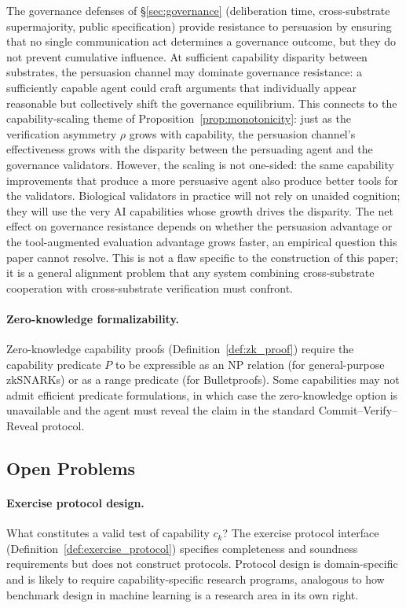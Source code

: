 The governance defenses of \S\ref{sec:governance} (deliberation
time, cross-substrate supermajority, public specification) provide
resistance to persuasion by ensuring that no single communication
act determines a governance outcome, but they do not prevent
cumulative influence.  At sufficient capability disparity between
substrates, the persuasion channel may dominate governance
resistance: a sufficiently capable agent could craft arguments that
individually appear reasonable but collectively shift the
governance equilibrium.  This connects to the capability-scaling
theme of Proposition~\ref{prop:monotonicity}: just as the
verification asymmetry $\rho$ grows with capability, the persuasion
channel's effectiveness grows with the disparity between the
persuading agent and the governance validators.  However, the
scaling is not one-sided: the same capability improvements that
produce a more persuasive agent also produce better tools for the
validators.  Biological validators in practice will not rely on
unaided cognition; they will use the very AI capabilities whose
growth drives the disparity.  The net effect on governance
resistance depends on whether the persuasion advantage or the
tool-augmented evaluation advantage grows faster, an empirical
question this paper cannot resolve.  This is not a flaw specific to
the construction of this paper; it is a general alignment problem
that any system combining cross-substrate cooperation with
cross-substrate verification must confront.

\paragraph{Zero-knowledge formalizability.}
Zero-knowledge capability proofs
(Definition~\ref{def:zk_proof}) require the capability predicate
$P$ to be expressible as an NP relation (for general-purpose
zkSNARKs) or as a range predicate (for Bulletproofs).  Some
capabilities may not admit efficient predicate formulations, in which
case the zero-knowledge option is unavailable and the agent must
reveal the claim in the standard Commit--Verify--Reveal protocol.

\subsection{Open Problems}

\paragraph{Exercise protocol design.}
What constitutes a valid test of capability $c_k$?  The exercise
protocol interface (Definition~\ref{def:exercise_protocol}) specifies
completeness and soundness requirements but does not construct protocols.
Protocol design is domain-specific and is likely to require
capability-specific research programs, analogous to how benchmark
design in machine learning is a research area in its own right.

